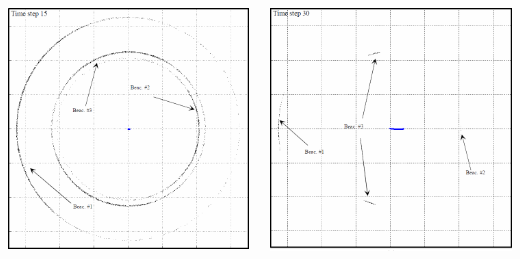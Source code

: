 \documentclass{beamer}
\begin{document}
\begin{frame}
\begin{columns}
			\centering			
			\includegraphics[scale=0.23]{blanco2008pure_fig3f}
			\par\bigskip
			\includegraphics[scale=0.23]{blanco2008pure_fig3g}
	\end{columns}
\end{frame}
\end{document}
